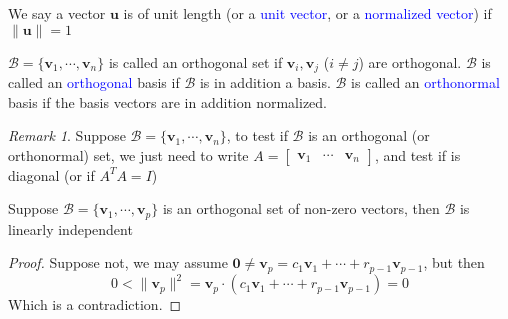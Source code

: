\documentclass{beamer}
\theoremstyle{definition}
\theoremstyle{remark}
\newtheorem*{remark}{Remark}
\begin{document}
\begin{frame}[t]
\begin{definition}
We say a vector $\mathbf u$ is of unit length (or a \textcolor{blue}{unit vector}, or a \textcolor{blue}{normalized vector}) if $\|\mathbf u\|=1$
\end{definition}
\pause
\begin{definition}
$\mathcal B=\{\mathbf v_1,\cdots,\mathbf v_n\}$ is called an orthogonal set if $\mathbf v_i,\mathbf v_j$ ($i\neq j$) are orthogonal\pause. $\mathcal B$ is called an \textcolor{blue}{orthogonal} basis if $\mathcal B$ is in addition a basis\pause. $\mathcal B$ is called an \textcolor{blue}{orthonormal} basis if the basis vectors are in addition normalized.
\end{definition}
\pause
\begin{remark}
Suppose $\mathcal B=\{\mathbf v_1,\cdots,\mathbf v_n\}$, to test if $\mathcal B$ is an orthogonal (or orthonormal) set, we just need to write $A=\begin{bmatrix}
\mathbf v_1&\cdots&\mathbf v_n
\end{bmatrix}$, and test if
\scalebox{0.9}{
$A^TA=\begin{bmatrix}
\mathbf v_1^T\\\mathbf v_2^T\\\vdots\\\mathbf v_n^T
\end{bmatrix}\begin{bmatrix}
\mathbf v_1&\mathbf v_2&\cdots&\mathbf v_n
\end{bmatrix}=\begin{bmatrix}
\mathbf v_1^T\mathbf v_1&\mathbf v_1^T\mathbf v_2&\cdots&\mathbf v_1^T\mathbf v_n\\
\mathbf v_2^T\mathbf v_1&\mathbf v_2^T\mathbf v_2&\cdots&\mathbf v_2^T\mathbf v_n\\
\vdots&\vdots&\ddots&\vdots\\
\mathbf v_n^T\mathbf v_1&\mathbf v_n^T\mathbf v_2&\cdots&\mathbf v_n^T\mathbf v_n\\
\end{bmatrix}$
}
is diagonal (or if $A^TA=I$)
\end{remark}
\end{frame}

\begin{frame}[t]
\begin{theorem}\label{01:12-07/15/2022}
Suppose $\mathcal B=\{\mathbf v_1,\cdots,\mathbf v_p\}$ is an orthogonal set of non-zero vectors, then $\mathcal B$ is linearly independent
\end{theorem}
\pause
\begin{proof}
Suppose not, we may assume $\mathbf 0\neq\mathbf v_p=c_1\mathbf v_1+\cdots+r_{p-1}\mathbf v_{p-1}$, but then
\[
0<\|\mathbf v_p\|^2=\mathbf v_p\cdot(c_1\mathbf v_1+\cdots+r_{p-1}\mathbf v_{p-1})=0
\]
Which is a contradiction.
\end{proof}
\end{frame}
\end{document}
